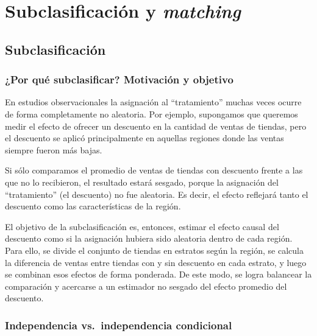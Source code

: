 \documentclass[
  letterpaper,
  DIV=11,
  numbers=noendperiod,
  oneside]{scrreprt}
\begin{document}

\hypertarget{sec-matching}{%
\chapter{\texorpdfstring{Subclasificación y
\emph{matching}}{Subclasificación y matching}}\label{sec-matching}}

\hypertarget{subclasificaciuxf3n}{%
\section{Subclasificación}\label{subclasificaciuxf3n}}

\hypertarget{por-quuxe9-subclasificar-motivaciuxf3n-y-objetivo}{%
\subsection{¿Por qué subclasificar? Motivación y
objetivo}\label{por-quuxe9-subclasificar-motivaciuxf3n-y-objetivo}}

En estudios observacionales la asignación al ``tratamiento'' muchas
veces ocurre de forma completamente no aleatoria. Por ejemplo,
supongamos que queremos medir el efecto de ofrecer un descuento en la
cantidad de ventas de tiendas, pero el descuento se aplicó
principalmente en aquellas regiones donde las ventas siempre fueron más
bajas.

Si sólo comparamos el promedio de ventas de tiendas con descuento frente
a las que no lo recibieron, el resultado estará sesgado, porque la
asignación del ``tratamiento'' (el descuento) no fue aleatoria. Es
decir, el efecto reflejará tanto el descuento como las características
de la región.

El objetivo de la subclasificación es, entonces, estimar el efecto
causal del descuento como si la asignación hubiera sido aleatoria dentro
de cada región. Para ello, se divide el conjunto de tiendas en estratos
según la región, se calcula la diferencia de ventas entre tiendas con y
sin descuento en cada estrato, y luego se combinan esos efectos de forma
ponderada. De este modo, se logra balancear la comparación y acercarse a
un estimador no sesgado del efecto promedio del descuento.

\hypertarget{independencia-vs.-independencia-condicional}{%
\subsection{Independencia vs.~independencia
condicional}\label{independencia-vs.-independencia-condicional}}
\end{document}
